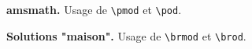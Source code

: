\documentclass[varwidth, border = 3pt]{standalone}
\begin{document}
\textbf{amsmath.}
Usage de \verb+\pmod+ et \verb +\pod+.

\test{\pmod}{\pod}


\bigskip


\textbf{Solutions "maison".}
Usage de \verb+\brmod+ et \verb +\brod+.

\test{\brmod}{\brod}
\end{document}
